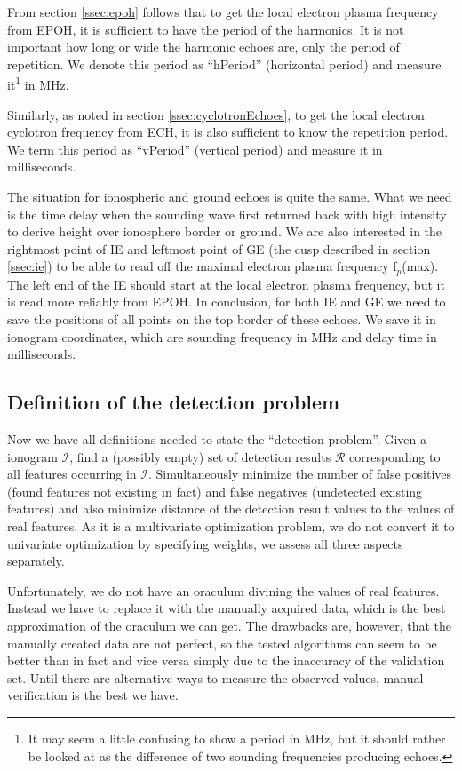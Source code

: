 From section \ref{ssec:epoh} follows that to get the local electron plasma frequency from EPOH, it is sufficient to have the period of the harmonics. It is not important how long or wide the harmonic echoes are, only the period of repetition. We  denote this period as ``hPeriod'' (horizontal period) and measure it\footnote{It may seem a little confusing to show a period in MHz, but it should rather be looked at as the difference of two sounding frequencies producing echoes.} in MHz.

Similarly, as noted in section \ref{ssec:cyclotronEchoes}, to get the local electron cyclotron frequency from ECH, it is also sufficient to know the repetition period. We term this period as ``vPeriod'' (vertical period) and measure it in milliseconds. 

The situation for ionospheric and ground echoes is quite the same. What we need is the time delay when the sounding wave first returned back with high intensity to derive height over ionosphere border or ground. We are also interested in the rightmost point of IE and leftmost point of GE (the cusp described in section \ref{ssec:ie}) to be able to read off the maximal electron plasma frequency f$_p$(max). The left end of the IE should start at the local electron plasma frequency, but it is read more reliably from EPOH. In conclusion, for both IE and GE we need to save the positions of all points on the top border of these echoes. We save it in ionogram coordinates, which are sounding frequency in MHz and delay time in milliseconds.

\subsection{Definition of the detection problem}
Now we have all definitions needed to state the ``detection problem''. Given a ionogram $\mathcal{I}$, find a (possibly empty) set of detection results $\mathcal{R}$ corresponding to all features occurring in $\mathcal{I}$. Simultaneously minimize the number of false positives (found features not existing in fact) and false negatives (undetected existing features) and also minimize distance of the detection result values to the values of real features. As it is a multivariate optimization problem, we do not convert it to univariate optimization by specifying weights, we assess all three aspects separately.

Unfortunately, we do not have an oraculum divining the values of real features. Instead we have to replace it with the manually acquired data, which is the best approximation of the oraculum we can get. The drawbacks are, however, that the manually created data are not perfect, so the tested algorithms can seem to be better than in fact and vice versa simply due to the inaccuracy of the validation set. Until there are alternative ways to measure the observed values, manual verification is the best we have.

